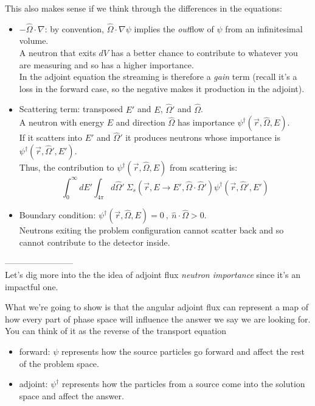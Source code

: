 \documentclass[12pt]{article}
\newcommand{\rvec}{\ensuremath{\vec{r}}}
\newcommand{\vOmega}{\ensuremath{\hat{\Omega}}}
\begin{document}
This also makes sense if we think through the differences in the equations:
\begin{itemize}
\item $-\vOmega \cdot \nabla$: by convention, $\vOmega \cdot \nabla \psi$ implies the \textit{out}flow of $\psi$ from an infinitesimal volume.\\
A neutron that exits $dV$ has a better chance to contribute to whatever you are measuring and so has a higher importance. \\
In the adjoint equation the streaming is therefore a \textit{gain} term (recall it's a loss in the forward case, so the negative makes it production in the adjoint).
%
\item Scattering term: transposed $E'$ and $E$, $\vOmega'$ and $\vOmega$. \\
A neutron with energy $E$ and direction  $\vOmega$ has importance $\psi^{\dagger}(\rvec, \vOmega, E)$. \\
If it scatters into $E'$ and $\vOmega'$ it produces neutrons whose importance is $\psi^{\dagger}(\rvec, \vOmega', E')$.\\
Thus, the contribution to $\psi^{\dagger}(\rvec, \vOmega, E)$ from scattering is:
\[
\int_0^{\infty} dE' \int_{4\pi} d\vOmega' \:\Sigma_s(\rvec, E \rightarrow E', \vOmega \cdot \vOmega')\psi^{\dagger}(\rvec, \vOmega', E')
\]
\item Boundary condition: $\psi^{\dagger}(\rvec, \vOmega, E) = 0\:, \: \hat{n}\cdot \vOmega > 0$.\\
Neutrons exiting the problem configuration cannot scatter back and so cannot contribute to the detector inside. 
\end{itemize}


------------------------\\
Let's dig more into the the idea of adjoint flux \textit{neutron importance} since it's an impactful one. 

What we're going to show is that the angular adjoint flux can represent a map of how every part of phase space will influence the answer we say we are looking for. You can think of it as the reverse of the transport equation 
\begin{itemize}
\item forward: $\psi$ represents how the source particles go forward and affect the rest of the problem space.
\item adjoint: $\psi^{\dagger}$ represents how the particles from a source come into the solution space and affect the answer. 
\end{itemize}
\end{document}
